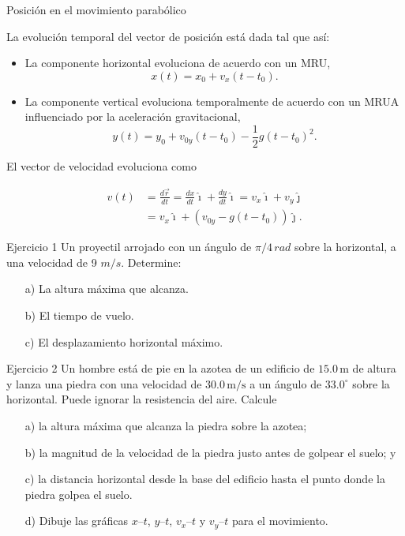     \begin{frame}{Posición en el movimiento parabólico}
    
    La evolución temporal del vector de posición está dada tal que así: \begin{itemize}
        \item La componente horizontal evoluciona de acuerdo con un MRU, \begin{equation}
            x(t)=x_0+v_x(t-t_0).
        \end{equation}
        \item La componente vertical evoluciona temporalmente de acuerdo con un MRUA influenciado por la aceleración gravitacional, \begin{equation}
            y(t)=y_0+v_{0y}(t-t_0)-\frac{1}{2}g(t-t_0)^2.
        \end{equation}
    \end{itemize}
    El vector de velocidad evoluciona como

    \begin{align}
        \nonumber v(t)&=\frac{d\vec{r}}{dt}=\frac{dx}{dt}\hat{\imath}+\frac{dy}{dt}\hat{\imath}=v_x\hat{\imath}+v_y\hat{\jmath}\\
        &=v_x\hat{\imath}+(v_{0y}-g(t-t_0))\hat{\jmath}.
    \end{align}
\end{frame}

\begin{frame}{Ejercicio 1}
    Un proyectil arrojado con un ángulo de $\pi/4\,\unit{rad}$ sobre la horizontal, a una velocidad de 9 $\unit{m}/\unit{s}$. Determine:
	
	\begin{itemize}
	    \item[a)] La altura máxima que alcanza.
	    \item[b)] El tiempo de vuelo.
	    \item[c)] El desplazamiento horizontal máximo.
	\end{itemize}
\end{frame}

\begin{frame}{Ejercicio 2}
    Un hombre está de pie en la azotea de un edificio de 
$15.0 \,\text{m}$ de altura y lanza una piedra con una velocidad de 
$30.0 \,\text{m/s}$ a un ángulo de $33.0^\circ$ sobre la horizontal. 
Puede ignorar la resistencia del aire. Calcule 
\begin{itemize}
    \item[a)] la altura máxima que alcanza la piedra sobre la azotea;
    \item[b)] la magnitud de la velocidad de la piedra justo antes de golpear el suelo; y
    \item[c)] la distancia horizontal desde la base del edificio hasta el punto donde la piedra golpea el suelo.
    \item[d)] Dibuje las gráficas $x$--$t$, $y$--$t$, $v_x$--$t$ y $v_y$--$t$ para el movimiento.
\end{itemize}
\end{frame}

